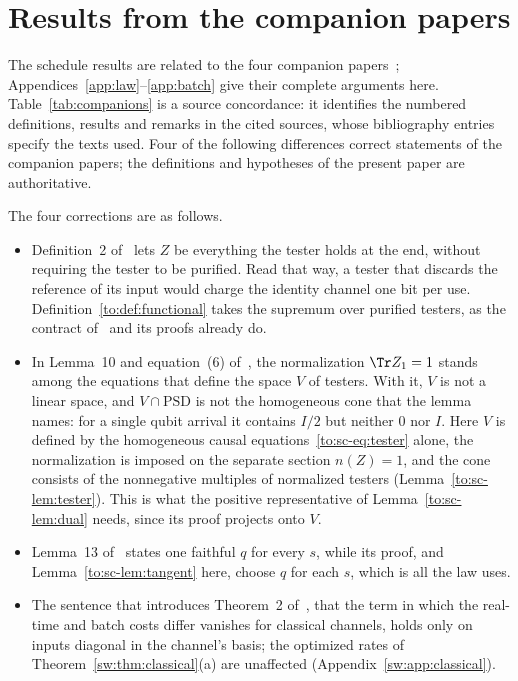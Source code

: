 \section{Results from the companion papers}\label{app:companions}

The schedule results are related to the four companion papers~\cite{Order,SaveWork,Answering,KeepingTime}; Appendices~\ref{app:law}--\ref{app:batch} give their complete arguments here. Table~\ref{tab:companions} is a source concordance: it identifies the numbered definitions, results and remarks in the cited sources, whose bibliography entries specify the texts used. Four of the following differences correct statements of the companion papers; the definitions and hypotheses of the present paper are authoritative.

The four corrections are as follows.
\begin{itemize}[leftmargin=*]
\item Definition~2 of~\cite{Order} lets $Z$ be everything the tester holds at the end, without requiring the tester to be purified. Read that way, a tester that discards the reference of its input would charge the identity channel one bit per use. Definition~\ref{to:def:functional} takes the supremum over purified testers, as the contract of~\cite[App.~B.1]{Order} and its proofs already do.
\item In Lemma~10 and equation~(6) of~\cite{Order}, the normalization $\Tr Z_1=1$ stands among the equations that define the space $V$ of testers. With it, $V$ is not a linear space, and $V\cap\mathrm{PSD}$ is not the homogeneous cone that the lemma names: for a single qubit arrival it contains $I/2$ but neither $0$ nor $I$. Here $V$ is defined by the homogeneous causal equations~\eqref{to:sc-eq:tester} alone, the normalization is imposed on the separate section $n(Z)=1$, and the cone consists of the nonnegative multiples of normalized testers (Lemma~\ref{to:sc-lem:tester}). This is what the positive representative of Lemma~\ref{to:sc-lem:dual} needs, since its proof projects onto $V$.
\item Lemma~13 of~\cite{Order} states one faithful $q$ for every $s$, while its proof, and Lemma~\ref{to:sc-lem:tangent} here, choose $q$ for each $s$, which is all the law uses.
\item The sentence that introduces Theorem~2 of~\cite{SaveWork}, that the term in which the real-time and batch costs differ vanishes for classical channels, holds only on inputs diagonal in the channel's basis; the optimized rates of Theorem~\ref{sw:thm:classical}(a) are unaffected (Appendix~\ref{sw:app:classical}).
\end{itemize}

